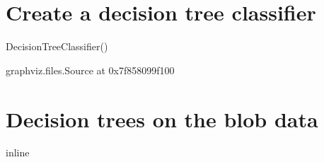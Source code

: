 \documentclass[letterpaper,10pt,english]{sphinxmanual}
\begin{document}
\section{Create a decision tree classifier}
\label{\detokenize{05-SupervisedSegmentation:create-a-decision-tree-classifier}}
\begin{sphinxVerbatim}[commandchars=\\\{\}]
  
\PYG{p}{[}   \PYG{p}{]}  
           \PYG{p}{[}   \PYG{p}{]}
\end{sphinxVerbatim}

\begin{sphinxVerbatim}[commandchars=\\\{\}]
DecisionTreeClassifier()
\end{sphinxVerbatim}

\begin{sphinxVerbatim}[commandchars=\\\{\}]
\end{sphinxVerbatim}

\begin{sphinxVerbatim}[commandchars=\\\{\}]
\PYGZlt{}graphviz.files.Source at 0x7f858099f100\PYGZgt{}
\end{sphinxVerbatim}


\section{Decision trees on the blob data}
\label{\detokenize{05-SupervisedSegmentation:decision-trees-on-the-blob-data}}
\begin{sphinxVerbatim}[commandchars=\\\{\}]
   
   
   
   
 inline
\end{sphinxVerbatim}
\end{document}
